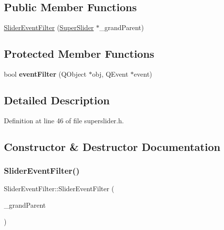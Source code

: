 \subsection*{Public Member Functions}
\begin{DoxyCompactItemize}
\item 
\hyperlink{class_slider_event_filter_a568bd52f3892fc149689cd036f50ff9b}{Slider\+Event\+Filter} (\hyperlink{class_super_slider}{Super\+Slider} $\ast$\+\_\+grand\+Parent)
\end{DoxyCompactItemize}
\subsection*{Protected Member Functions}
\begin{DoxyCompactItemize}
\item 
\mbox{\label{class_slider_event_filter_a705b5e6e07f9b5a4e7da804e74b0401a}} 
bool {\bfseries event\+Filter} (Q\+Object $\ast$obj, Q\+Event $\ast$event)
\end{DoxyCompactItemize}


\subsection{Detailed Description}


Definition at line 46 of file superslider.\+h.



\subsection{Constructor \& Destructor Documentation}
\mbox{\label{class_slider_event_filter_a568bd52f3892fc149689cd036f50ff9b}} 
\subsubsection{\texorpdfstring{Slider\+Event\+Filter()}{SliderEventFilter()}}
{\footnotesize\ttfamily Slider\+Event\+Filter\+::\+Slider\+Event\+Filter (\begin{DoxyParamCaption}\item[{\hyperlink{class_super_slider}{Super\+Slider} $\ast$}]{\+\_\+grand\+Parent }\end{DoxyParamCaption})\hspace{0.3cm}{\ttfamily [inline]}}

